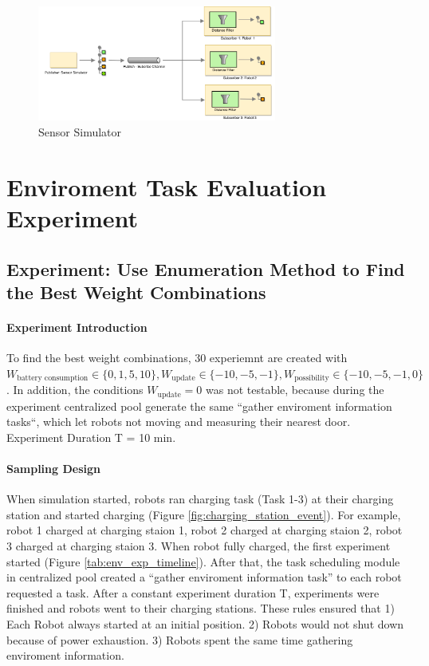 \begin{figure}
\centering
\includegraphics[width = 0.7\textwidth]{content/images/ch4/sensor_simulator.drawio.png}
\caption{Sensor Simulator}
\label{fig:sensor_simulator}
\end{figure}

\section{Enviroment Task Evaluation Experiment}


\subsection{Experiment: Use Enumeration Method to Find the Best Weight Combinations}
\label{sec:enviroment_experiment_enumerate}
\paragraph{Experiment Introduction} To find the best weight combinations, 30 experiemnt are created with $W_{\mbox{battery consumption}} \in \{ 0,1,5,10 \},  W_{\mbox{update}} \in \{-10,-5,-1\}, W_{\mbox{possibility}} \in \{-10,-5,-1,0\}$. In addition, the conditions $W_{\mbox{update}}=0$ was not testable, because during the experiment centralized pool generate the same ``gather enviroment information tasks``, which let robots not moving and measuring their nearest door. Experiment Duration T = 10 min.

\paragraph{Sampling Design} When simulation started, robots ran charging task (Task 1-3) at their charging station and started charging (Figure \ref{fig:charging_station_event}). For example, robot 1 charged at charging staion 1, robot 2 charged at charging staion 2, robot 3 charged at charging staion 3. When robot fully charged, the first experiment started (Figure \ref{tab:env_exp_timeline}). After that, the task scheduling module in centralized pool created a ``gather enviroment information task'' to each robot requested a task. After a constant experiment duration T, experiments were finished and robots went to their charging stations. These rules ensured that 1) Each Robot always started at an initial position. 2) Robots would not shut down because of power exhaustion. 3) Robots spent the same time gathering enviroment information.

